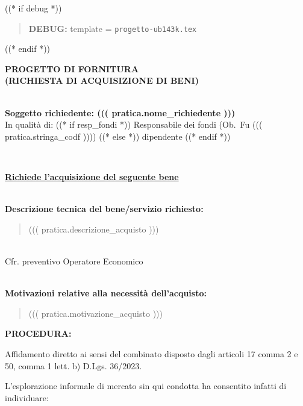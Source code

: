 \documentclass[a4paper,12pt]{letter}
\begin{document}
\topaddr

((* if debug *))
\begin{quotation}
	\textbf{DEBUG:} template = \texttt{progetto-ub143k.tex}
\end{quotation}
((* endif *))

\begin{center}
\textbf{PROGETTO DI FORNITURA \\ (RICHIESTA DI ACQUISIZIONE DI BENI)}
\end{center}

~\\
\textbf{Soggetto richiedente: ((( pratica.nome_richiedente )))} \\

In qualità di:          %
((* if resp_fondi *)) Responsabile dei fondi (Ob.~Fu ((( pratica.stringa_codf ))))
((* else *)) dipendente
((* endif *))

~\\
\begin{center}
\textbf{\underline{Richiede l'acquisizione del seguente bene}}
\end{center}

~\\
\textbf{Descrizione tecnica del bene/servizio richiesto:}
\begin{quote}
((( pratica.descrizione_acquisto )))
\end{quote}

~\\
Cfr. preventivo Operatore Economico 

~\\
\textbf{Motivazioni relative alla necessità dell’acquisto: }
\begin{quote}
((( pratica.motivazione_acquisto )))
\end{quote}


\textbf{PROCEDURA: } %

Affidamento diretto ai sensi del combinato disposto dagli articoli 17 comma 2 e 50, comma 1 lett. b) D.Lgs. 36/2023.

L’esplorazione informale di mercato sin qui condotta ha consentito infatti di individuare:
\end{document}
